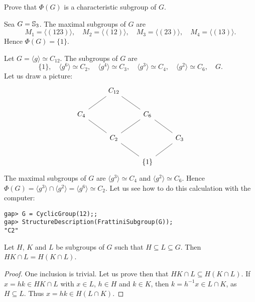 \begin{exercise}
\label{xca:Phi(G)char}
Prove that $\Phi(G)$ is a characteristic subgroup of $G$. 
\end{exercise}

\begin{example}
Sea $G=\mathbb{S}_3$. The maximal subgroups of $G$ are 
\[
M_1=\langle (123)\rangle,
\quad
M_2=\langle (12)\rangle,
\quad
M_3=\langle (23)\rangle,
\quad
M_4=\langle (13)\rangle.
\]
Hence $\Phi(G)=\{1\}$. 
\end{example}

\begin{example}
Let $G=\langle g\rangle\simeq C_{12}$. The subgroups of $G$ are 
\[
\{1\},\quad
\langle g^6\rangle\simeq C_2,\quad
\langle g^4\rangle\simeq C_3,\quad
\langle g^3\rangle\simeq C_4,\quad
\langle g^2\rangle\simeq C_6,\quad
G.
\]
Let us draw a picture:
\[\begin{tikzcd}
	& {C_{12}} \\
	{C_4} && {C_6} \\
	& {C_2} && {C_3} \\
	&& {\{1\}}
	\arrow[no head, from=4-3, to=3-2]
	\arrow[no head, from=4-3, to=3-4]
	\arrow[no head, from=3-4, to=2-3]
	\arrow[no head, from=2-3, to=1-2]
	\arrow[no head, from=3-2, to=2-1]
	\arrow[no head, from=2-1, to=1-2]
	\arrow[no head, from=3-2, to=2-3]
\end{tikzcd}\]
The maximal subgroups of $G$ are 
$\langle g^3\rangle\simeq C_4$ and $\langle
g^2\rangle\simeq C_6$. Hence $\Phi(G)=\langle g^3\rangle\cap \langle
g^2\rangle=\langle g^6\rangle\simeq C_2$. 
Let us see how to do this calculation with the computer:
\begin{lstlisting}
gap> G = CyclicGroup(12);;
gap> StructureDescription(FrattiniSubgroup(G));
"C2"
\end{lstlisting} 
\end{example}

\begin{lemma}[Dedekind]
\label{lem:Dedekind}
Let $H$, $K$ and $L$ be subgroups of $G$ 
such that $H\subseteq L\subseteq G$. Then 
$HK\cap L=H(K\cap L)$.
\end{lemma}

\begin{proof}
One inclusion is trivial. Let us prove then that 
$HK\cap L\subseteq H(K\cap L)$. If 
$x=hk\in HK\cap L$ with $x\in L$, $h\in H$ and $k\in K$, then 
$k=h^{-1}x\in L\cap K$, as $H\subseteq L$. Thus $x=hk\in H(L\cap
	K)$.
\end{proof}

